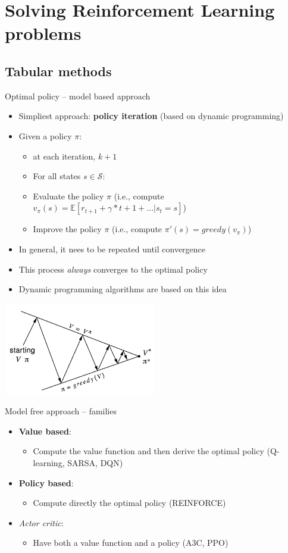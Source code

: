 \documentclass[presentation, 9pt]{beamer}\mode<presentation>{\usetheme{AMSBolognaFC}}
\begin{document}
\section{Solving Reinforcement Learning problems}
\subsection{Tabular methods}
\begin{frame}{Optimal policy -- model based approach}
\begin{itemize}
	\item Simpliest approach: \textbf{policy iteration} (based on dynamic programming)
	\item Given a policy $\pi$:
	\begin{itemize}
		\item at each iteration, $k+1$
		\item For all states $s \in \mathcal{S}$:
		\item Evaluate the policy $\pi$ (i.e., compute $v_{\pi}(s) = \mathbb{E}[r_{t+1} + \gamma * {t+1} + ... | s_t = s]$)
		\item Improve the policy $\pi$ (i.e., compute $\pi'(s) = greedy(v_\pi)$)
	\end{itemize}
	\item In general, it nees to be repeated until convergence
	\item This process \emph{always} converges to the optimal policy
	\item Dynamic programming algorithms are based on this idea
\end{itemize}
\centering
\includegraphics[width=0.5\textwidth]{img/policy-iteration.png}
\end{frame}
\begin{frame}{Model free approach -- families}
	\begin{itemize}
		\item \textbf{Value based}:
		\begin{itemize}
			\item Compute the value function and then derive the optimal policy (Q-learning, SARSA, DQN)
		\end{itemize}
		\item \textbf{Policy based}:
		\begin{itemize}
			\item Compute directly the optimal policy (REINFORCE)
		\end{itemize}
		\item \emph{Actor critic}:
		\begin{itemize}
			\item Have both a value function and a policy (A3C, PPO)
		\end{itemize}
	\end{itemize}
\end{frame}
\end{document}
